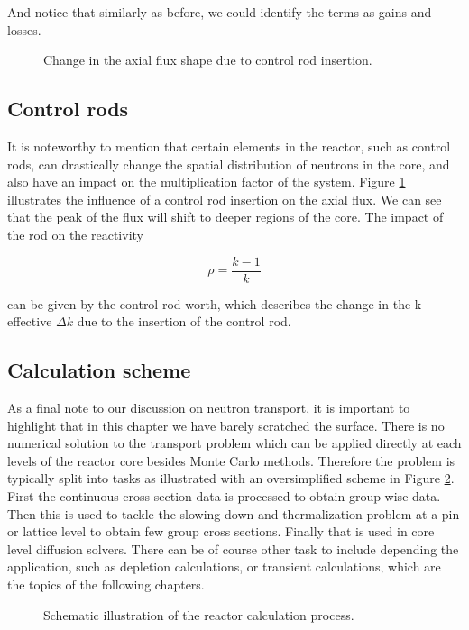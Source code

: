 And notice that similarly as before, we could identify the terms as gains and losses.


\begin{figure}[ht!]
\protect {}\protect
\caption{\label{fig:controlrod} \footnotesize{Change in the axial flux shape due to control rod insertion.}}
\end{figure}

\subsection{Control rods}

It is noteworthy to mention that certain elements in the reactor, such as control rods, can drastically change the spatial distribution of neutrons in the core, and also have an impact on the multiplication factor of the system. Figure \ref{fig:controlrod} illustrates the influence of a control rod insertion on the axial flux. We can see that the peak of the flux will shift to deeper regions of the core. The impact of the rod on the reactivity 

\[
\rho=\frac{k-1}{k}
\]

\noindent can be given by the control rod worth, which describes the change in the k-effective $\Delta k$ due to the insertion of the control rod.  

\subsection{Calculation scheme}

As a final note to our discussion on neutron transport, it is important to highlight that in this chapter we have barely scratched the surface. There is no numerical solution to the transport problem which can be applied directly at each levels of the reactor core besides Monte Carlo methods. Therefore the problem is typically split into tasks as illustrated with an oversimplified scheme in Figure \ref{fig:calculationscheme}. First the continuous cross section data is processed to obtain group-wise data. Then this is used to tackle the slowing down and thermalization problem at a pin or lattice level to obtain few group cross sections. Finally that is used in core level diffusion solvers. There can be of course other task to include depending the application, such as depletion calculations, or transient calculations, which are the topics of the following chapters.

\begin{figure}[ht!]
\protect {}\protect
\caption{\label{fig:calculationscheme} \footnotesize{Schematic illustration of the reactor calculation process.}}
\end{figure} 


%

